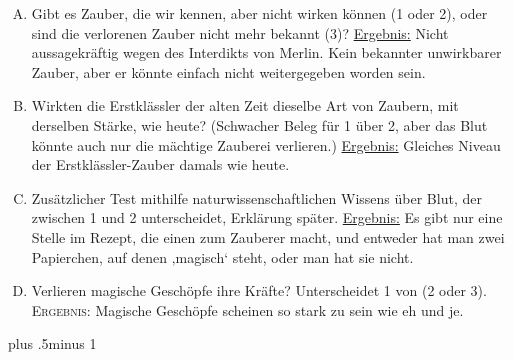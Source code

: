 \begin{centering}
\nopagebreak
\itshape
 \begin{enumerate}[A.]{
 \firmlist
 \setlength{\leftmargin}{\parindent}
 \setlength{\rightmargin}{1cm}}
\item Gibt es Zauber, die wir kennen, aber nicht wirken können (1 oder 2), oder sind die verlorenen Zauber nicht mehr bekannt (3)? \uline{Ergebnis:} Nicht aussagekräftig wegen des Interdikts von Merlin. Kein bekannter unwirkbarer Zauber, aber er könnte einfach nicht weitergegeben worden sein.
\item Wirkten die Erstklässler der alten Zeit dieselbe Art von Zaubern, mit derselben Stärke, wie heute? (Schwacher Beleg für 1 über 2, aber das Blut könnte auch nur die mächtige Zauberei verlieren.) \uline{Ergebnis:} Gleiches Niveau der Erstklässler-Zauber damals wie heute.
\item Zusätzlicher Test mithilfe naturwissenschaftlichen Wissens über Blut, der zwischen 1 und 2 unterscheidet, Erklärung später. \uline{Ergebnis:} Es gibt nur eine Stelle im Rezept, die einen zum Zauberer macht, und entweder hat man zwei Papierchen, auf denen ‚magisch‘ steht, oder man hat sie nicht.
\item Verlieren magische Geschöpfe ihre Kräfte? Unterscheidet 1 von (2 oder 3). {\scshape Ergebnis:} Magische Geschöpfe scheinen so stark zu sein wie eh und je.
 \end{enumerate}
\end{centering}
\baselineskip plus .5\textheight minus 1\baselineskip
\restoretrivseps

